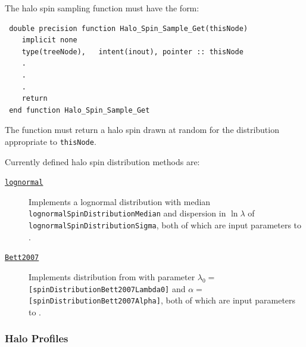 The halo spin sampling function must have the form:
\begin{verbatim}
 double precision function Halo_Spin_Sample_Get(thisNode)
    implicit none
    type(treeNode),   intent(inout), pointer :: thisNode
    .
    .
    .
    return
 end function Halo_Spin_Sample_Get
\end{verbatim}
The function must return a halo spin drawn at random for the distribution appropriate to {\tt thisNode}. 

Currently defined halo spin distribution methods are:
\begin{description}
 \item [\hyperlink{dark_matter_halos.spins.distributions.lognormal.F90:halo_spin_distributions_lognormal:halo_spin_distribution_lognormal}{{\tt lognormal}}] Implements a lognormal distribution with median {\tt lognormalSpinDistributionMedian} and dispersion in $\ln\lambda$ of {\tt lognormalSpinDistributionSigma}, both of which are input parameters to \glc.
 \item [\hyperlink{dark_matter_halos.spins.distributions.Bett2007.F90:halo_spin_distributions_bett2007}{{\tt Bett2007}}] Implements distribution from \cite{bett_spin_2007} with parameter $\lambda_0=${\tt [spinDistributionBett2007Lambda0]} and $\alpha=${\tt [spinDistributionBett2007Alpha]}, both of which are input parameters to \glc.
\end{description}

\subsubsection{Halo Profiles}

